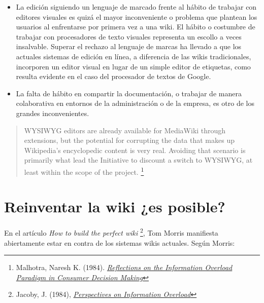 \documentclass[12pt, a4paper,twoside]{book}
\begin{document}
\begin{itemize}
\item
  La edición siguiendo un lenguaje de marcado frente al hábito de
  trabajar con editores visuales es quizá el mayor inconveniente o
  problema que plantean los usuarios al enfrentarse por primera vez a
  una wiki. El hábito o costumbre de trabajar con procesadores de
  texto visuales representa un escollo a veces insalvable. Superar el
  rechazo al lenguaje de marcas ha llevado a que los actuales
  sistemas de edición en línea, a diferencia de las wikis
  tradicionales, incorporen un editor visual en lugar de un simple
  editor de etiquetas, como resulta evidente en el caso del
  procesador de textos de Google.
\item
  La falta de hábito en compartir la documentación, o trabajar de
  manera colaborativa en entornos de la administración o de la
  empresa, es otro de los grandes inconvenientes.
\end{itemize}
\begin{quote}
WYSIWYG editors are already available for MediaWiki through
extensions, but the potential for corrupting the data that makes up
Wikipedia's encyclopedic content is very real. Avoiding that
scenario is primarily what lead the Initiative to discount a switch
to WYSIWYG, at least within the scope of the project.%
\footnote{Malhotra, Naresh K. (1984).
\emph{\href{http://www.jstor.org/pss/2488913}{Reflections on the Information Overload Paradigm in Consumer Decision Making}}}

\end{quote}
\section{Reinventar la wiki ¿es posible?}

En el artículo \emph{How to build the perfect wiki}%
\footnote{Jacoby, J. (1984),
\emph{\href{http://www.jstor.org/pss/2488912}{Perspectives on Information Overload}}},
Tom Morris manifiesta abiertamente estar en contra de los sistemas
wikis actuales. Según Morris:
\end{document}
